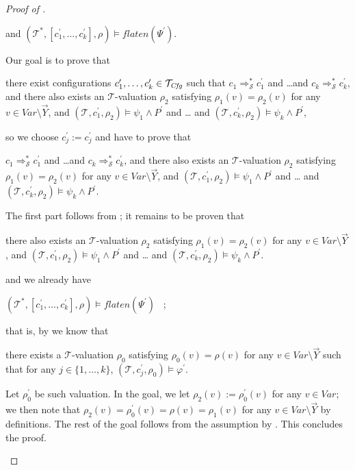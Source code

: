 \begin{proof}[Proof of ]
\begin{enumerate}
\begin{proofenv}
        and $(\mathcal{T}^*, [c^\prime_1,\ldots,c^\prime_k], \rho) \vDash \mathit{flaten}(\Psi^\prime)$.
    \end{proofenv}
    Our goal is to prove that
    \begin{proofenv}
        there exist configurations $c_1^\prime,\ldots,c_k^\prime \in \mathcal{T}_{\mathit{Cfg}}$
        such that $c_1 \Rightarrow^{*}_{\mathcal{S}} c_1^\prime$
        and \ldots and $c_k \Rightarrow^{*}_{\mathcal{S}} c_k^\prime$,
        and there also exists an $\mathcal{T}$-valuation $\rho_2$
        satisfying $\rho_1(v) = \rho_2(v)$ for any $v \in \mathit{Var} \setminus \vec{Y}$,
        and
        $(\mathcal{T}, c_1^\prime,\rho_2) \vDash \psi_1 \land P^\prime$ and \ldots
        and $(\mathcal{T}, c_k^\prime, \rho_2) \vDash \psi_k \land P^\prime$,
    \end{proofenv}
    so we choose $c^\prime_j := c^\prime_j$ and have to prove that
    \begin{proofenv}
        $c_1 \Rightarrow^{*}_{\mathcal{S}} c_1^\prime$
        and \ldots and $c_k \Rightarrow^{*}_{\mathcal{S}} c_k^\prime$,
        and there also exists an $\mathcal{T}$-valuation $\rho_2$
        satisfying $\rho_1(v) = \rho_2(v)$ for any $v \in \mathit{Var} \setminus \vec{Y}$,
        and
        $(\mathcal{T}, c_1^\prime,\rho_2) \vDash \psi_1 \land P^\prime$ and \ldots
        and $(\mathcal{T}, c_k^\prime, \rho_2) \vDash \psi_k \land P^\prime$.
    \end{proofenv}
    The first part follows from ;
    it remains to be proven that
    \begin{proofenv}
        there also exists an $\mathcal{T}$-valuation $\rho_2$
        satisfying $\rho_1(v) = \rho_2(v)$ for any $v \in \mathit{Var} \setminus \vec{Y}$,
        and
        $(\mathcal{T}, c_1^\prime,\rho_2) \vDash \psi_1 \land P^\prime$ and \ldots
        and $(\mathcal{T}, c_k^\prime, \rho_2) \vDash \psi_k \land P^\prime$.
    \end{proofenv}
    and we already have
    \begin{proofenv}
        $(\mathcal{T}^*, [c^\prime_1,\ldots,c^\prime_k], \rho) \vDash \mathit{flaten}(\Psi^\prime)$ \, ;
    \end{proofenv}
    that is, by  we know that
    \begin{proofenv}
        there exists a $\mathcal{T}$-valuation $\rho_0$ satisfying $\rho_0(v) = \rho(v)$
        for any $v \in \mathit{Var} \setminus \vec{Y}$ such that for any $j \in \{ 1, \ldots, k \}$,
        $(\mathcal{T}, c^\prime_j, \rho_0) \vDash \varphi^\prime$.
    \end{proofenv}
    Let $\rho_0^\prime$ be such valuation.
    In the goal, we let $\rho_2(v) := \rho_0^\prime(v)$ for any $v \in \mathit{Var}$;
    we then note that $\rho_2(v) = \rho_0^\prime(v) =  \rho(v) =  \rho_1(v)$ for any $v \in \mathit{Var} \setminus \vec{Y}$ by definitions.
    The rest of the goal follows from the assumption by .
    This concludes the proof.
\end{enumerate}
\end{proof}

